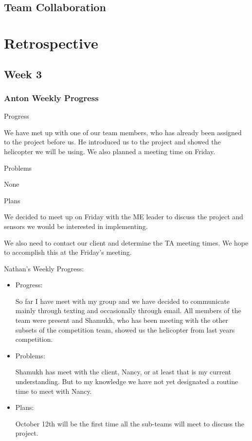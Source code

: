 \documentclass[onecolumn, oneside, letterpaper, draftclsnofoot, 10pt, compsoc]{IEEEtran}
\begin{document}
\subsection{Team Collaboration}

\section{Retrospective}


\subsection{Week 3}
\subsubsection{Anton Weekly Progress}
Progress

We have met up with one of our team members, who has already been assigned to the project before us. He introduced us to the project and showed the helicopter we will be using. We also planned a meeting time on Friday.

Problems

None

Plans

We decided to meet up on Friday with the ME leader to discuss the project and sensors we would be interested in implementing.

We also need to contact our client and determine the TA meeting times. We hope to accomplish this at the Friday's meeting.

Nathan's Weekly Progress:
\begin{itemize}
    \item Progress:

So far I have meet with my group and we have decided to communicate mainly through texting and occasionally through email. All members of the team were present and Shamukh, who has been meeting with the other subsets of the competition team, showed us the helicopter from last years competition.
    \item Problems:

Shamukh has meet with the client, Nancy, or at least that is my current understanding. But to my knowledge we have not yet designated a routine time to meet with Nancy.
    \item Plans:

October 12th will be the first time all the sub-teams will meet to discuss the project.
    \end{itemize}
\end{document}
